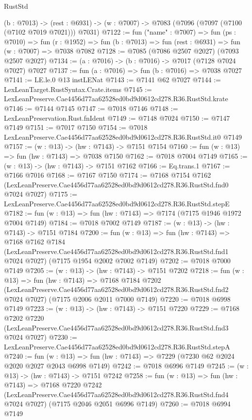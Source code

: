 \begin{lexlean}{RustStd}
\begin{coremodule}
  (b : @7013) ->
  (rest : @6931) -> (w : @7007) -> @7083 (@7096 (@7097 (@7100 (@7102 @7019 @7021))) @7031)
@7122 := fun ("name" : @7007) =>
  fun (ps : @7010) =>
  fun (r : @1952) => fun (b : @7013) => fun (rest : @6931) => fun (w : @7007) => @7038 @7082
@7128 := @7085 (@7086 @2507 @2027) (@7093 @2507 @2027)
@7134 := (a : @7016) -> (b : @7016) -> @7017 (@7128 @7024 @7027) @7027
@7137 := fun (a : @7016) => fun (b : @7016) => @7038 @7027
@7141 := LE.le.{0} @13 instLENat
@7143 := @7141 @62 @7027
@7144 := LexLeanTarget.RustSyntax.Crate.items
@7145 := LexLeanPreserve.Cae4456d77aa62528ed0bd9d0612cd278.R36.RustStd.krate
@7146 := @7144 @7145
@7147 := @7018 @7146
@7148 := LexLeanPreservation.Rust.fnIdent
@7149 := @7148 @7024
@7150 := @7147 @7149
@7151 := @7017 @7150
@7154 := @7018 LexLeanPreserve.Cae4456d77aa62528ed0bd9d0612cd278.R36.RustStd.it0 @7149
@7157 := (w : @13) -> (hw : @7143) -> @7151 @7154
@7160 := fun (w : @13) => fun (hw : @7143) => @7038 @7150
@7162 := @7018 @7004 @7149
@7165 := (w : @13) -> (hw : @7143) -> @7151 @7162
@7166 := Eq.trans.{1}
@7167 := @7166 @7016
@7168 := @7167 @7150
@7174 := @7168
    @7154
    @7162
    (LexLeanPreserve.Cae4456d77aa62528ed0bd9d0612cd278.R36.RustStd.fnd0 @7024 @7027)
@7175 := LexLeanPreserve.Cae4456d77aa62528ed0bd9d0612cd278.R36.RustStd.stepE
@7182 := fun (w : @13) => fun (hw : @7143) => @7174 (@7175 @1946 @1972 @7004 @7149)
@7184 := @7018 @7002 @7149
@7187 := (w : @13) -> (hw : @7143) -> @7151 @7184
@7200 := fun (w : @13) =>
  fun (hw : @7143) =>
  @7168
    @7162
    @7184
    (LexLeanPreserve.Cae4456d77aa62528ed0bd9d0612cd278.R36.RustStd.fnd1 @7024 @7027)
    (@7175 @1954 @2002 @7002 @7149)
@7202 := @7018 @7000 @7149
@7205 := (w : @13) -> (hw : @7143) -> @7151 @7202
@7218 := fun (w : @13) =>
  fun (hw : @7143) =>
  @7168
    @7184
    @7202
    (LexLeanPreserve.Cae4456d77aa62528ed0bd9d0612cd278.R36.RustStd.fnd2 @7024 @7027)
    (@7175 @2006 @2011 @7000 @7149)
@7220 := @7018 @6998 @7149
@7223 := (w : @13) -> (hw : @7143) -> @7151 @7220
@7229 := @7168
    @7202
    @7220
    (LexLeanPreserve.Cae4456d77aa62528ed0bd9d0612cd278.R36.RustStd.fnd3 @7024 @7027)
@7230 := LexLeanPreserve.Cae4456d77aa62528ed0bd9d0612cd278.R36.RustStd.stepA
@7240 := fun (w : @13) => fun (hw : @7143) => @7229 (@7230 @62 @2024 @2020 @2027 @2043 @6998 @7149)
@7242 := @7018 @6996 @7149
@7245 := (w : @13) -> (hw : @7143) -> @7151 @7242
@7258 := fun (w : @13) =>
  fun (hw : @7143) =>
  @7168
    @7220
    @7242
    (LexLeanPreserve.Cae4456d77aa62528ed0bd9d0612cd278.R36.RustStd.fnd4 @7024 @7027)
    (@7175 @2046 @2051 @6996 @7149)
@7260 := @7018 @6994 @7149

\end{coremodule}
\end{lexlean}
